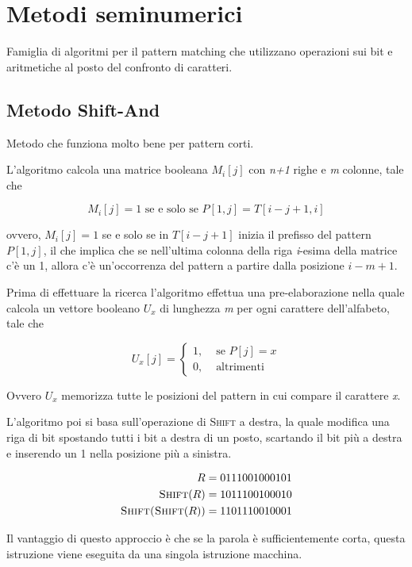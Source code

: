 \section{Metodi seminumerici}\label{metodi-seminumerici}

Famiglia di algoritmi per il pattern matching che utilizzano operazioni
sui bit e aritmetiche al posto del confronto di caratteri.

\subsection{Metodo Shift-And}\label{metodo-shift-and}

Metodo che funziona molto bene per pattern corti.

L'algoritmo calcola una matrice booleana $M_i[j]$ con
\emph{n+1} righe e \emph{m} colonne, tale che

$$
M_i[j] = 1 \text { se e solo se } P[1,j] = T[i-j+1, i]
$$

ovvero, $ M_i[j] = 1 $ se e solo se in $ T[i-j+1] $ inizia il prefisso del pattern $ P[1,j] $, il che implica che se nell'ultima colonna della riga \emph{i}-esima
della matrice c'è un 1, allora c'è un'occorrenza del pattern a partire
dalla posizione $i-m+1$.

Prima di effettuare la ricerca l'algoritmo effettua una pre-elaborazione
nella quale calcola un vettore booleano $U_x$ di lunghezza
\emph{m} per ogni carattere dell'alfabeto, tale che

$$U_x[j] = \begin{cases} 
1,& \text{ se } P[j] = x\\
0, & \text{ altrimenti} 
\end{cases}$$

Ovvero $U_x$ memorizza tutte le posizioni del pattern in cui
compare il carattere \emph{x}.

L'algoritmo poi si basa sull'operazione di \textsc{Shift} a destra, la
quale modifica una riga di bit spostando tutti i bit a destra di un
posto, scartando il bit più a destra e inserendo un 1 nella posizione più
a sinistra.

\begin{align*}
R &= 0111001000101 \\
\textsc{Shift}(R) &= 1011100100010 \\
\textsc{Shift(Shift}(R)) &= 1101110010001
\end{align*}

Il vantaggio di questo approccio è che se la parola è sufficientemente
corta, questa istruzione viene eseguita da una singola istruzione
macchina.

